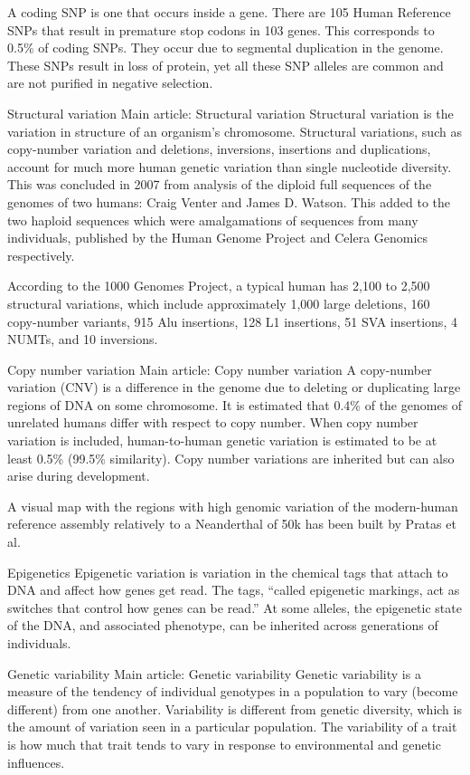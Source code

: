 A coding SNP is one that occurs inside a gene. There are 105 Human Reference SNPs that result in premature stop codons in 103 genes. This corresponds to 0.5\% of coding SNPs. They occur due to segmental duplication in the genome. These SNPs result in loss of protein, yet all these SNP alleles are common and are not purified in negative selection.

Structural variation
Main article: Structural variation
Structural variation is the variation in structure of an organism's chromosome. Structural variations, such as copy-number variation and deletions, inversions, insertions and duplications, account for much more human genetic variation than single nucleotide diversity. This was concluded in 2007 from analysis of the diploid full sequences of the genomes of two humans: Craig Venter and James D. Watson. This added to the two haploid sequences which were amalgamations of sequences from many individuals, published by the Human Genome Project and Celera Genomics respectively.

According to the 1000 Genomes Project, a typical human has 2,100 to 2,500 structural variations, which include approximately 1,000 large deletions, 160 copy-number variants, 915 Alu insertions, 128 L1 insertions, 51 SVA insertions, 4 NUMTs, and 10 inversions.

Copy number variation
Main article: Copy number variation
A copy-number variation (CNV) is a difference in the genome due to deleting or duplicating large regions of DNA on some chromosome. It is estimated that 0.4\% of the genomes of unrelated humans differ with respect to copy number. When copy number variation is included, human-to-human genetic variation is estimated to be at least 0.5\% (99.5\% similarity). Copy number variations are inherited but can also arise during development.

A visual map with the regions with high genomic variation of the modern-human reference assembly relatively to a Neanderthal of 50k has been built by Pratas et al.

Epigenetics
Epigenetic variation is variation in the chemical tags that attach to DNA and affect how genes get read. The tags, ``called epigenetic markings, act as switches that control how genes can be read.'' At some alleles, the epigenetic state of the DNA, and associated phenotype, can be inherited across generations of individuals.

Genetic variability
Main article: Genetic variability
Genetic variability is a measure of the tendency of individual genotypes in a population to vary (become different) from one another. Variability is different from genetic diversity, which is the amount of variation seen in a particular population. The variability of a trait is how much that trait tends to vary in response to environmental and genetic influences.


